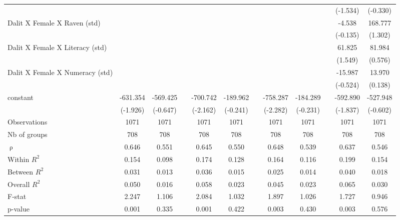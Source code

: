 {\begin{longtable}{@{\extracolsep{\fill}}lccccccccccc}
          &       &       &       &       &       &       &       &       &       & (-1.534) & (-0.330) \\
    Dalit X Female X Raven (std) &       &       &       &       &       &       &       &       &       & -4.538 & 168.777 \\
          &       &       &       &       &       &       &       &       &       & (-0.135) & (1.302) \\
    Dalit X Female X Literacy (std) &       &       &       &       &       &       &       &       &       & 61.825 & 81.984 \\
          &       &       &       &       &       &       &       &       &       & (1.549) & (0.576) \\
    Dalit X Female X Numeracy (std) &       &       &       &       &       &       &       &       &       & -15.987 & 13.970 \\
          &       &       &       &       &       &       &       &       &       & (-0.524) & (0.138) \\
    constant & -631.354 & -569.425 &       & -700.742 & -189.962 &       & -758.287 & -184.289 &       & -592.890 & -527.948 \\
          & (-1.926) & (-0.647) &       & (-2.162) & (-0.241) &       & (-2.282) & (-0.231) &       & (-1.837) & (-0.602) \\
    \midrule
    Observations & 1071  & 1071  &       & 1071  & 1071  &       & 1071  & 1071  &       & 1071  & 1071 \\
    Nb of groups & 708   & 708   &       & 708   & 708   &       & 708   & 708   &       & 708   & 708 \\
    $\uprho$ & 0.646 & 0.551 &       & 0.645 & 0.550 &       & 0.648 & 0.539 &       & 0.637 & 0.546 \\
    Within $R^2$ & 0.154 & 0.098 &       & 0.174 & 0.128 &       & 0.164 & 0.116 &       & 0.199 & 0.154 \\
    Between $R^2$ & 0.031 & 0.013 &       & 0.036 & 0.015 &       & 0.025 & 0.014 &       & 0.040 & 0.018 \\
    Overall $R^2$ & 0.050 & 0.016 &       & 0.058 & 0.023 &       & 0.045 & 0.023 &       & 0.065 & 0.030 \\
    F-stat & 2.247 & 1.106 &       & 2.084 & 1.032 &       & 1.897 & 1.026 &       & 1.727 & 0.946 \\
    p-value & 0.001 & 0.335 &       & 0.001 & 0.422 &       & 0.003 & 0.430 &       & 0.003 & 0.576 \\
    \bottomrule

    \end{longtable}%
}